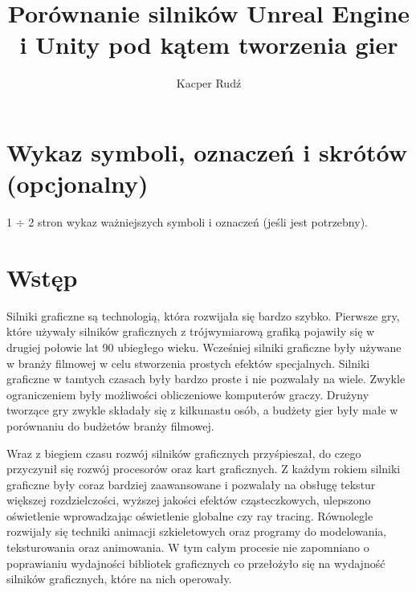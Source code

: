 \documentclass[12pt,twoside]{article}
\author{Kacper Rudź}
\title{Porównanie silników Unreal Engine i Unity pod kątem tworzenia gier}
\begin{document}
\maketitle

\blankpage

\tableofcontents

\clearpage
\blankpage


\section*{Wykaz symboli, oznaczeń i skrótów (opcjonalny)}
%

1 $\div$ 2 stron wykaz ważniejszych symboli i oznaczeń (jeśli jest potrzebny).
\clearpage

\section{Wstęp}

Silniki graficzne są technologią, która rozwijała się bardzo szybko. Pierwsze
gry, które używały silników graficznych z trójwymiarową grafiką pojawiły się w
drugiej połowie lat 90 ubiegłego wieku. Wcześniej silniki graficzne były używane
w branży filmowej w celu stworzenia prostych efektów specjalnych. Silniki
graficzne w tamtych czasach były bardzo proste i nie pozwalały na wiele. Zwykle
ograniczeniem były możliwości obliczeniowe komputerów graczy. Drużyny tworzące
gry zwykle składały się z kilkunastu osób, a budżety gier były małe w porównaniu
do budżetów branży filmowej. 

Wraz z biegiem czasu rozwój silników graficznych przyśpieszał, do czego
przyczynił się rozwój procesorów oraz kart graficznych. Z każdym rokiem silniki
graficzne były coraz bardziej zaawansowane i pozwalały na obsługę tekstur
większej rozdzielczości, wyższej jakości efektów cząsteczkowych, ulepszono
oświetlenie wprowadzając oświetlenie globalne czy ray tracing. Równolegle
rozwijały się techniki animacji szkieletowych oraz programy do modelowania,
teksturowania oraz animowania. W tym całym procesie nie zapomniano o poprawianiu
wydajności bibliotek graficznych co przełożyło się na wydajność silników
graficznych, które na nich operowały. 
\end{document}

